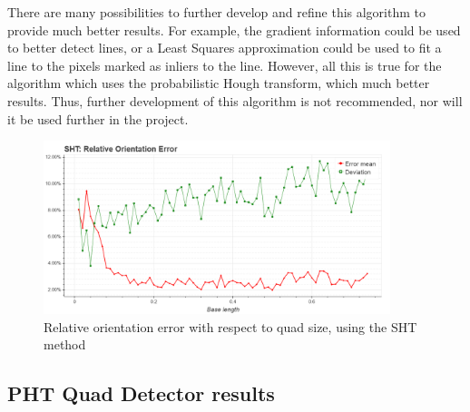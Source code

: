 There are many possibilities to further develop and refine this algorithm to provide much better results.
For example, the gradient information could be used to better detect lines, or a Least Squares approximation could be used to fit a line to the pixels marked as inliers to the line.
However, all this is true for the algorithm which uses the probabilistic Hough transform, which much better results.
Thus, further development of this algorithm is not recommended, nor will it be used further in the project.
\begin{figure}[ht]
	\centering
	\includegraphics[width=0.9\textwidth]{figures/plots/sht_relative_orientation_error.png}
	\caption{Relative orientation error with respect to quad size, using the SHT method}
	\label{fig:shtRelOrientErr}
\end{figure}

\clearpage

\subsection{PHT Quad Detector results}

